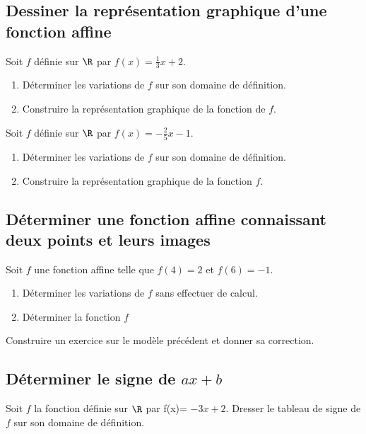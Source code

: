 \documentclass[20pt]{article}
\begin{document}
\subsection{Dessiner la représentation graphique d'une fonction affine}

\Exe

Soit $f$ définie sur $\R$ par $f(x)= \frac{1}{3}x+2$.

\begin{enumerate}
\item Déterminer les variations de $f$ sur son domaine de définition.
\item Construire la représentation graphique de la fonction de  $f$.
 \end{enumerate}

\Exe

Soit $f$ définie sur $\R$ par $f(x)= -\frac{2}{5}x-1$.

\begin{enumerate}
\item Déterminer les variations de $f$ sur son domaine de définition.
\item Construire la représentation graphique de la fonction $f$.
\end{enumerate}


\subsection{Déterminer une fonction affine connaissant deux points et leurs images}

\Exe 

Soit $f$ une fonction affine telle que $f(4)=2$ et $f(6)=-1$. 
\begin{enumerate}
\item Déterminer les variations de $f$ sans effectuer de calcul.
\item Déterminer la fonction $f$
\end{enumerate}

\Exe

Construire un exercice sur le modèle précédent et donner sa correction.


\subsection{Déterminer le signe de $ax+b$}

\Exe

Soit $f$ la fonction définie sur $\R$ par f(x)= $-3x+2$.
Dresser le tableau de signe de $f$ sur son domaine de définition.
\end{document}
